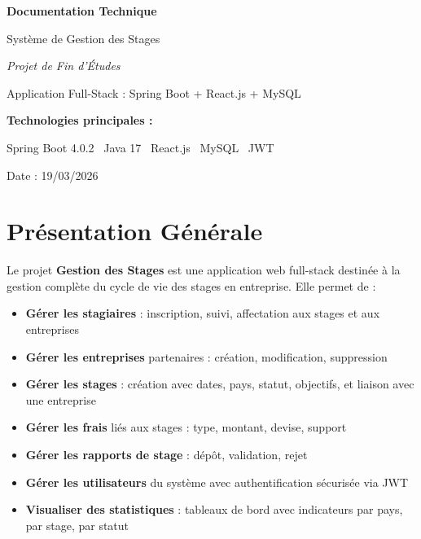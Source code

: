 \documentclass[12pt,a4paper]{report}
\begin{document}
\begin{titlepage}
\centering
\vspace*{2cm}
{\Huge\bfseries Documentation Technique\par}
\vspace{0.5cm}
{\LARGE Système de Gestion des Stages\par}
\vspace{2cm}
{\Large\itshape Projet de Fin d'Études\par}
\vspace{1cm}
{\large Application Full-Stack : Spring Boot + React.js + MySQL\par}
\vspace{3cm}
{\large\bfseries Technologies principales :\par}
\vspace{0.3cm}
{\large Spring Boot 4.0.2 \textbullet\ Java 17 \textbullet\ React.js \textbullet\ MySQL \textbullet\ JWT\par}
\vfill
{\large Date : 19/03/2026\par}
\end{titlepage}

\tableofcontents
\newpage

\chapter{Présentation Générale}

Le projet \textbf{Gestion des Stages} est une application web full-stack destinée à la gestion complète du cycle de vie des stages en entreprise. Elle permet de :

\begin{itemize}
    \item \textbf{Gérer les stagiaires} : inscription, suivi, affectation aux stages et aux entreprises
    \item \textbf{Gérer les entreprises} partenaires : création, modification, suppression
    \item \textbf{Gérer les stages} : création avec dates, pays, statut, objectifs, et liaison avec une entreprise
    \item \textbf{Gérer les frais} liés aux stages : type, montant, devise, support
    \item \textbf{Gérer les rapports de stage} : dépôt, validation, rejet
    \item \textbf{Gérer les utilisateurs} du système avec authentification sécurisée via JWT
    \item \textbf{Visualiser des statistiques} : tableaux de bord avec indicateurs par pays, par stage, par statut
\end{itemize}
\end{document}
